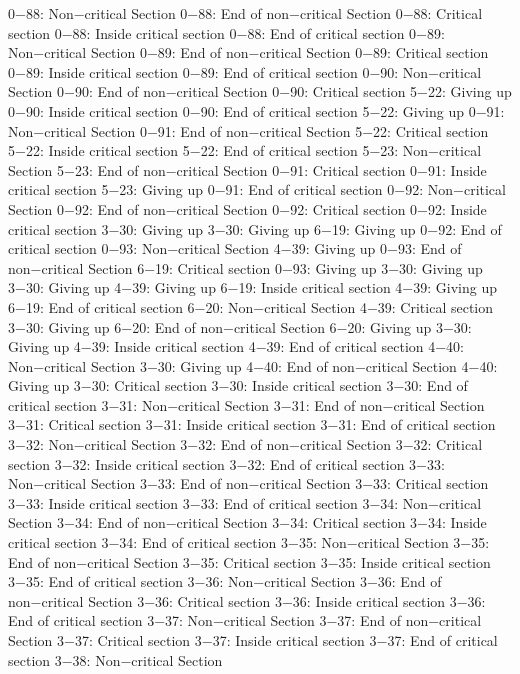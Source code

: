 0−88: Non−critical Section
0−88: End of non−critical Section
0−88: Critical section
0−88: Inside critical section
0−88: End of critical section
0−89: Non−critical Section
0−89: End of non−critical Section
0−89: Critical section
0−89: Inside critical section
0−89: End of critical section
0−90: Non−critical Section
0−90: End of non−critical Section
0−90: Critical section
5−22: Giving up
0−90: Inside critical section
0−90: End of critical section
5−22: Giving up
0−91: Non−critical Section
0−91: End of non−critical Section
5−22: Critical section
5−22: Inside critical section
5−22: End of critical section
5−23: Non−critical Section
5−23: End of non−critical Section
0−91: Critical section
0−91: Inside critical section
5−23: Giving up
0−91: End of critical section
0−92: Non−critical Section
0−92: End of non−critical Section
0−92: Critical section
0−92: Inside critical section
3−30: Giving up
3−30: Giving up
6−19: Giving up
0−92: End of critical section
0−93: Non−critical Section
4−39: Giving up
0−93: End of non−critical Section
6−19: Critical section
0−93: Giving up
3−30: Giving up
3−30: Giving up
4−39: Giving up
6−19: Inside critical section
4−39: Giving up
6−19: End of critical section
6−20: Non−critical Section
4−39: Critical section
3−30: Giving up
6−20: End of non−critical Section
6−20: Giving up
3−30: Giving up
4−39: Inside critical section
4−39: End of critical section
4−40: Non−critical Section
3−30: Giving up
4−40: End of non−critical Section
4−40: Giving up
3−30: Critical section
3−30: Inside critical section
3−30: End of critical section
3−31: Non−critical Section
3−31: End of non−critical Section
3−31: Critical section
3−31: Inside critical section
3−31: End of critical section
3−32: Non−critical Section
3−32: End of non−critical Section
3−32: Critical section
3−32: Inside critical section
3−32: End of critical section
3−33: Non−critical Section
3−33: End of non−critical Section
3−33: Critical section
3−33: Inside critical section
3−33: End of critical section
3−34: Non−critical Section
3−34: End of non−critical Section
3−34: Critical section
3−34: Inside critical section
3−34: End of critical section
3−35: Non−critical Section
3−35: End of non−critical Section
3−35: Critical section
3−35: Inside critical section
3−35: End of critical section
3−36: Non−critical Section
3−36: End of non−critical Section
3−36: Critical section
3−36: Inside critical section
3−36: End of critical section
3−37: Non−critical Section
3−37: End of non−critical Section
3−37: Critical section
3−37: Inside critical section
3−37: End of critical section
3−38: Non−critical Section
